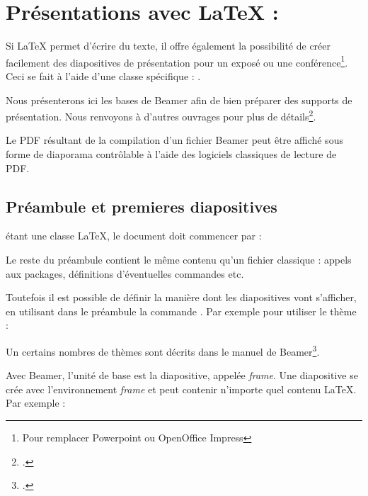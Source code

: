 \chapter{Présentations avec \LaTeX{} : }\label{beamer}

\begin{prealable}
Si \LaTeX{} permet d'écrire du texte, il offre également la possibilité de créer facilement des diapositives de présentation pour un exposé ou une conférence\footnote{Pour remplacer Powerpoint ou OpenOffice Impress}. Ceci se fait à l'aide d'une classe spécifique : .

Nous présenterons ici les bases de Beamer afin de bien préparer des supports de présentation. Nous renvoyons à d'autres ouvrages pour plus de détails\footcites[On consultera pour une introduction plus approfondie][]{intro_beamer}[pour les usages avancées on se servira du manuel : ][]{beamer}.

Le PDF résultant de la compilation d'un fichier Beamer peut être affiché sous forme de diaporama contrôlable à l'aide des logiciels classiques de lecture de PDF.
\end{prealable}

\section{Préambule et premieres diapositives}

 étant une classe \LaTeX{}, le document doit commencer par :


Le reste du préambule contient le même contenu qu'un fichier  classique : appels aux packages, définitions d'éventuelles commandes etc.

Toutefois il est possible de définir la manière dont les diapositives vont s'afficher, en utilisant dans le préambule la commande . Par exemple pour utiliser le thème  :

\begin{latexcode}
\end{latexcode}

Un certains nombres de thèmes sont décrits dans le manuel de Beamer\footcite{beamer_theme}.

Avec Beamer, l'unité de base  est la diapositive, appelée \textenglish{\emph{frame}}. Une diapositive se crée avec l'environnement \emph{frame} et peut contenir n'importe quel contenu \LaTeX{}.
Par exemple :


